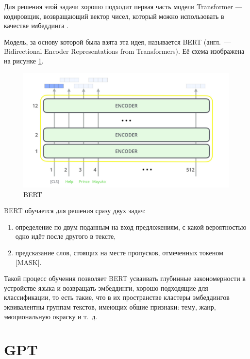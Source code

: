 Для решения этой задачи хорошо подходит первая часть модели Transformer --- кодировщик, возвращающий вектор чисел, который можно использовать в качестве эмбеддинга \cite{art:bert}.

Модель, за основу которой была взята эта идея, называется BERT (англ. --- Bidirectional Encoder Representations from Transformers). Её схема изображена на рисунке \ref*{fig:bert}.

\begin{figure}[H]
    \centering
    \includegraphics[width=\textwidth]{../inc/images/bert.png}
    \caption{BERT}
    \label{fig:bert}
\end{figure}

BERT обучается для решения сразу двух задач:
\begin{enumerate}
    \item определение по двум поданным на вход предложениям, с какой вероятностью одно идёт после другого в тексте,
    \item предсказание слов, стоящих на месте пропусков, отмеченных токеном [MASK].
\end{enumerate}

Такой процесс обучения позволяет BERT усваивать глубинные закономерности в устройстве языка и возвращать эмбеддинги, хорошо подходящие для классификации, то есть такие, что в их пространстве кластеры эмбеддингов эквивалентны группам текстов, имеющих общие признаки: тему, жанр, эмоциональную окраску и т. д.

\section{GPT}


